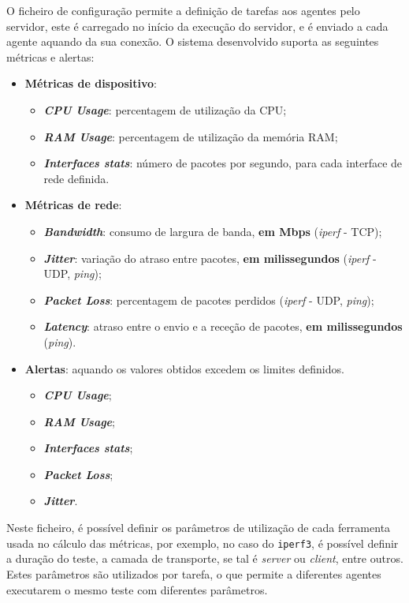 \documentclass[a4paper,12pt]{scrreprt}
\begin{document}
O ficheiro de configuração permite a definição de tarefas aos agentes pelo servidor,
este é carregado no início da execução do servidor, e é enviado a cada agente aquando
da sua conexão. O sistema desenvolvido suporta as seguintes métricas e alertas:

\begin{itemize}
    \item \textbf{Métricas de dispositivo}:
    \begin{itemize}
        \item \textbf{\textit{CPU Usage}}: percentagem de utilização da CPU;
        \item \textbf{\textit{RAM Usage}}: percentagem de utilização da memória RAM;
        \item \textbf{\textit{Interfaces stats}}: número de pacotes por segundo,
            para cada interface de rede definida.
    \end{itemize}
    \item \textbf{Métricas de rede}:
    \begin{itemize}
        \item \textbf{\textit{Bandwidth}}: consumo de largura de banda, \textbf{em Mbps} (\textit{iperf} - TCP); 
        \item \textbf{\textit{Jitter}}: variação do atraso entre pacotes, \textbf{em milissegundos}  (\textit{iperf} - UDP, \textit{ping});
        \item \textbf{\textit{Packet Loss}}: percentagem de pacotes perdidos (\textit{iperf} - UDP, \textit{ping}); 
        \item \textbf{\textit{Latency}}: atraso entre o envio e a receção de pacotes, \textbf{em milissegundos} (\textit{ping}). 
    \end{itemize}
    \item \textbf{Alertas}: aquando os valores obtidos excedem os limites definidos.
    \begin{itemize}
        \item \textbf{\textit{CPU Usage}};
        \item \textbf{\textit{RAM Usage}};
        \item \textbf{\textit{Interfaces stats}};
        \item \textbf{\textit{Packet Loss}};
        \item \textbf{\textit{Jitter}}.
    \end{itemize}
\end{itemize}

Neste ficheiro, é possível definir os parâmetros de utilização de cada ferramenta usada no cálculo das métricas,
por exemplo, no caso do \texttt{iperf3}, é possível definir a duração do teste, a camada de transporte, se tal é
\textit{server} ou \textit{client}, entre outros. Estes parâmetros são utilizados por tarefa, o que permite a
diferentes agentes executarem o mesmo teste com diferentes parâmetros.
\end{document}
